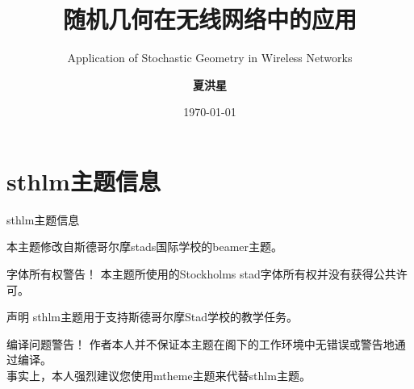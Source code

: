 \documentclass[newPxFont,sthlmFooter]{beamer}
\title{随机几何在无线网络中的应用}
\subtitle{Application of Stochastic Geometry in Wireless Networks}
\author{\textbf{夏洪星}}
\institute{\small{xiahongxing@gmail.com}}
\date{\today}
\begin{document}
%
%

\maketitle


%
%

\section*{sthlm主题信息}


\begin{frame}[c]{sthlm主题信息}

{本主题修改自斯德哥尔摩stads国际学校的beamer主题}。

\vspace{1em}

\begin{alertblock}{字体所有权警告！}
本主题所使用的Stockholms stad字体所有权并没有获得公共许可。 
\end{alertblock}

\end{frame}


\begin{frame}[c]{声明}
sthlm主题用于支持斯德哥尔摩Stad学校的教学任务。 \\

\vspace{1em}

\begin{alertblock}{编译问题警告！}
作者本人并不保证本主题在阁下的工作环境中无错误或警告地通过编译。 \\
\vspace{1em}
事实上，本人强烈建议您使用mtheme主题来代替sthlm主题。
\end{alertblock}

\end{frame}
\end{document}
